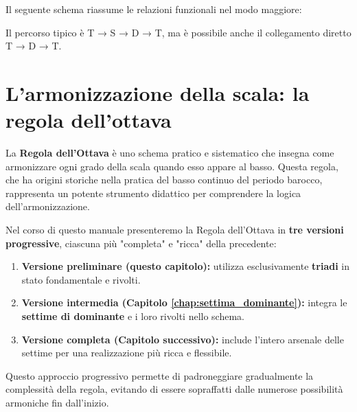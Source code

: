 	Il seguente schema riassume le relazioni funzionali nel modo maggiore:
	
	\begin{center}
	\end{center}
	
	Il percorso tipico è T → S → D → T, ma è possibile anche il collegamento diretto T → D → T.


\section{L'armonizzazione della scala: la regola dell'ottava}
\label{sec:regola_ottava_funzioni}

La \textbf{Regola dell'Ottava} è uno schema pratico e sistematico che insegna come armonizzare ogni grado della scala quando esso appare al basso. Questa regola, che ha origini storiche nella pratica del basso continuo del periodo barocco, rappresenta un potente strumento didattico per comprendere la logica dell'armonizzazione.

\begin{definizione}
	\label{def:versioni_regola_ottava}
	Nel corso di questo manuale presenteremo la Regola dell'Ottava in \textbf{tre versioni progressive}, ciascuna più "completa" e "ricca" della precedente:
	
	\begin{enumerate}
		\item \textbf{Versione preliminare (questo capitolo):} utilizza esclusivamente \textbf{triadi} in stato fondamentale e rivolti.
		\item \textbf{Versione intermedia (Capitolo \ref{chap:settima_dominante}):} integra le \textbf{settime di dominante} e i loro rivolti nello schema.
		\item \textbf{Versione completa (Capitolo successivo):} include l'intero arsenale delle settime per una realizzazione più ricca e flessibile.
	\end{enumerate}
	
	Questo approccio progressivo permette di padroneggiare gradualmente la complessità della regola, evitando di essere sopraffatti dalle numerose possibilità armoniche fin dall'inizio.
\end{definizione}

